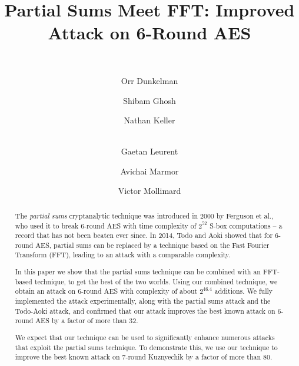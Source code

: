 \documentclass[runningheads]{llncs}
\let\doisave\doi  %
\begin{document}
\let\doi\doisave %


\title{Partial Sums Meet FFT: Improved Attack on 6-Round AES}
\author{~}
\institute{~}
\author{
 Orr Dunkelman \and Shibam Ghosh \and Nathan Keller \and \\ Gaetan Leurent \and Avichai Marmor \and Victor Mollimard
}





\maketitle              %

\begin{abstract}
The \emph{partial sums} cryptanalytic technique was introduced in 2000 by Ferguson et al., who used it to break 6-round AES with time complexity of $2^{52}$ S-box computations -- a record that has not been beaten ever since. In 2014, Todo and Aoki showed that for 6-round AES, partial sums can be replaced by a technique based on the Fast Fourier Transform (FFT), leading to an attack with a comparable complexity.

In this paper we show that the partial sums technique can be combined with an FFT-based technique, to get the best of the two worlds. Using our combined technique, we obtain an attack on 6-round AES with complexity of about $2^{46.4}$ additions. We fully implemented the attack experimentally, along with the partial sums attack and the Todo-Aoki attack, and confirmed that our attack improves the best known attack on 6-round AES by a factor of more than 32.

We expect that our technique can be used to significantly enhance numerous attacks that exploit the partial sums technique. To demonstrate this, we use our technique to improve the best known attack on 7-round Kuznyechik by a factor of more than 80.
\end{abstract}
\end{document}
